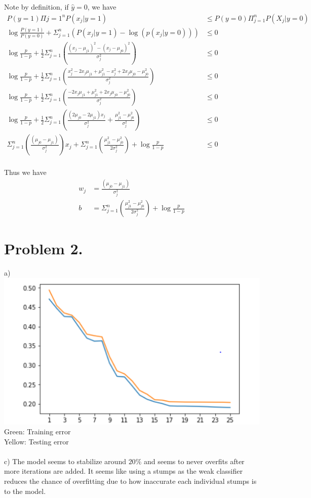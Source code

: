 \documentclass[paper=a4, fontsize=11pt]{scrartcl} %
\numberwithin{equation}{section} %
\numberwithin{figure}{section} %
\numberwithin{table}{section} %
\begin{document}
Note by definition, if $\hat{y} = 0$, we have
\begin{align*}
P(y = 1) \Pi{j=1}^{n} P(x_j|y=1) &\leq P(y = 0) \Pi_{j=1}^{n} P(X_j|y=0) \\
\log{\frac{P(y=1)}{P(y=0)}} + \Sigma_{j=1}^{n} (P(x_j|y=1) - \log(p(x_j|y=0))) &\leq 0 \\
\log{\frac{p}{1-p}} + \frac{1}{2}\Sigma_{j=1}^{n} ( \frac{(x_j - \mu_{j1})^2 - (x_j - \mu_{j0})^2 }{\sigma_j^2})  &\leq 0 \\
\log{\frac{p}{1-p}} + \frac{1}{2}\Sigma_{j=1}^{n} ( \frac{x_j^2 - 2x_j \mu_{j1} + \mu_{j1}^2 - x_j^2 + 2x_j \mu_{j0} - \mu_{j0}^2 }{\sigma_j^2})  &\leq 0 \\
\log{\frac{p}{1-p}} + \frac{1}{2}\Sigma_{j=1}^{n} ( \frac{- 2x_j \mu_{j1} + \mu_{j1}^2  + 2x_j \mu_{j0} - \mu_{j0}^2 }{\sigma_j^2})  &\leq 0 \\
\log{\frac{p}{1-p}} + \frac{1}{2}\Sigma_{j=1}^{n} ( \frac{(2 \mu_{j0} - 2\mu_{j1}) x_j}{\sigma_j^2} + \frac{\mu_{j1}^2  - \mu_{j0}^2 }{\sigma_j^2})  &\leq 0 \\
\Sigma_{j=1}^{n} ( \frac{(\mu_{j0} - \mu_{j1})}{\sigma_j^2})  x_j +  \Sigma_{j=1}^{n} (\frac{\mu_{j1}^2  - \mu_{j0}^2 }{2\sigma_j^2}) + \log{\frac{p}{1-p}}  &\leq 0 \\
\end{align*}


Thus we have 
\begin{align*}
w_j &= \frac{(\mu_{j0} - \mu_{j1})}{\sigma_j^2} \\
b   &= \Sigma_{j=1}^{n} (\frac{\mu_{j1}^2  - \mu_{j0}^2 }{2\sigma_j^2}) + \log{\frac{p}{1-p}}
\end{align*}
\newpage 

\section*{Problem 2.}
a) \\
\includegraphics{A1I1} \\
Green: Training error \\
Yellow: Testing error \\
\\
c) The model seems to stabilize around $20\%$ and seems to never overfits after more iterations are added. It seems like using a stumps as the weak classifier reduces the chance of overfitting due to how inaccurate each individual stumps is to the model. 
\newpage
\end{document}
